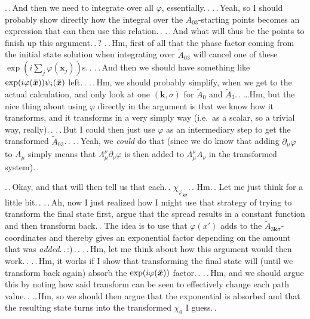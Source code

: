 \documentclass{report}
\begin{document}
.\,.\,And then we need to integrate over all $\varphi$, essentially.\,. .\,.\,Yeah, so I should probably show directly how the integral over the $A_{03}$-starting points becomes an expression that can then use this relation.\,. .\,.\,And what will thus be the points to finish up this argument.\,.\,? .\,.\,Hm, first of all that the phase factor coming from the initial state solution when integrating over $\tilde A_{03}$ will cancel one of these $\exp(i\sum_j\varphi(\boldsymbol{x}_j))$s.\,. .\,.\,And then we should have something like 
$\exp(i\varphi(\bar{\boldsymbol{x}\hspace{.05em}}\hspace{-.05em}))\psi_i(\bar{\boldsymbol{x}\hspace{.05em}}\hspace{-.05em})$ left.\,. .\,.\,Hm, we should probably simplify, when we get to the actual calculation, and only look at one $(\boldsymbol{k},\sigma)$ for $\tilde A_0$ and $\tilde A_3$.\,. \ldots Hm, but the nice thing about using $\varphi$ directly in the argument is that we know how it transforms, and it transforms in a very simply way (i.e.\ as a scalar, so a trivial way, really).\,. .\,.\,But I could then just use $\varphi$ as an intermediary step to get the transformed $\tilde A_{03}$.\,. .\,.\,Yeah, we \emph{could} do that (since we do know that adding $\partial_\mu\varphi$ to $A_\mu$ simply means that $\Lambda_\mu^\nu\partial_\nu\varphi$ is then added to $\Lambda_\mu^\nu A_\nu$ in the transformed system).\,.

.\,.\,Okay, and that will then tell us that each.\,. $\chi_{\varphi_{\boldsymbol{k}\sigma}}$.\,. Hm.\,. Let me just think for a little bit.\,. .\,.\,Ah, now I just realized how I might use that strategy of trying to transform the final state first, argue that the spread results in a constant function and then transform back.\,. The idea is to use that $\varphi(x')$ adds to the $\tilde A_{3\boldsymbol{k}\sigma}$-coordinates and thereby gives an exponential factor depending on the amount that was \emph{added}.\,.\,:)\,.\,. %
.\,.\,Hm, let me think about how this argument would then work.\,. .\,.\,Hm, it works if I show that transforming the final state will (until we transform back again) absorb the $\exp(i\varphi(\bar{\boldsymbol{x}\hspace{.05em}}\hspace{-.05em}))$ factor.\,. .\,.\,Hm, and we should argue this by noting how said transform can be seen to effectively change each path value.\,. %
\ldots Hm, so we should then argue that the exponential is absorbed and that the resulting state turns into the transformed $\chi_0$ I guess.\,. 
\end{document}
